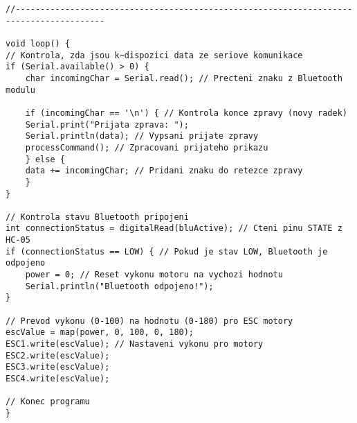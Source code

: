 \documentclass[12pt]{report}
\begin{document}
\begin{appendices}
\begin{lstlisting}[title={}, caption={}, label={}, basicstyle=\footnotesize\ttfamily, inputencoding=utf8]
//----------------------------------------------------------------------------------------

void loop() {
// Kontrola, zda jsou k~dispozici data ze seriove komunikace
if (Serial.available() > 0) {
	char incomingChar = Serial.read(); // Precteni znaku z Bluetooth modulu

	if (incomingChar == '\n') { // Kontrola konce zpravy (novy radek)
	Serial.print("Prijata zprava: ");
	Serial.println(data); // Vypsani prijate zpravy
	processCommand(); // Zpracovani prijateho prikazu
	} else {
	data += incomingChar; // Pridani znaku do retezce zpravy
	}
}

// Kontrola stavu Bluetooth pripojeni
int connectionStatus = digitalRead(bluActive); // Cteni pinu STATE z HC-05
if (connectionStatus == LOW) { // Pokud je stav LOW, Bluetooth je odpojeno
	power = 0; // Reset vykonu motoru na vychozi hodnotu
	Serial.println("Bluetooth odpojeno!");
}

// Prevod vykonu (0-100) na hodnotu (0-180) pro ESC motory
escValue = map(power, 0, 100, 0, 180); 
ESC1.write(escValue); // Nastaveni vykonu pro motory
ESC2.write(escValue);
ESC3.write(escValue);
ESC4.write(escValue);

// Konec programu
}	
\end{lstlisting}  
\end{appendices}
\end{document}
